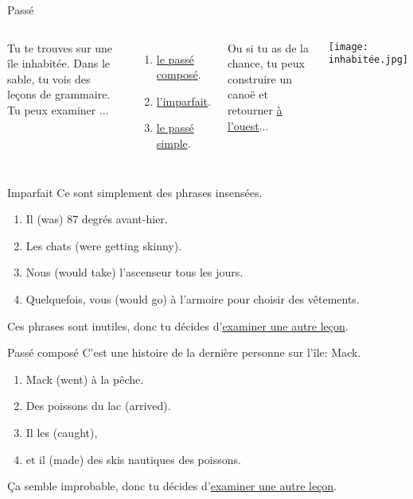 \documentclass{beamer}
\begin{document}
  \begin{frame}{Passé}
    \hypertarget{passé}{}
    \begin{columns}
        Tu te trouves sur une île inhabitée.
        Dans le sable, tu vois des leçons de grammaire.
        Tu peux examiner ...
        \begin{enumerate}
          \item \hyperlink{composé}{le passé composé}.
          \item \hyperlink{imparfait}{l'imparfait}.
          \item \hyperlink{simple}{le passé simple}.
        \end{enumerate}
        Ou si tu as de la chance, tu peux construire un canoë et retourner \hyperlink{mort}{à l'ouest}...
        \begin{center}
          \texttt{[image: inhabitée.jpg]}
        \end{center}
    \end{columns}
  \end{frame}

  \begin{frame}{Imparfait}
    \hypertarget{imparfait}{}
    Ce sont simplement des phrases insensées.
    \begin{enumerate}
      \item Il \underline{} (was) 87 degrés avant-hier.
      \item<3-> Les chats \underline{} (were getting skinny).
      \item<5-> Nous \underline{} (would take) l'ascenseur tous les jours.
      \item<7-> Quelquefois, vous \underline{} (would go) à l'armoire pour choisir des vêtements.
    \end{enumerate}
    Ces phrases sont inutiles, donc tu décides d'\hyperlink{passé}{examiner une autre leçon}.
  \end{frame}

  \begin{frame}{Passé composé}
    \hypertarget{composé}{}
    C'est une histoire de la dernière personne sur l'île: Mack.
    \begin{enumerate}
      \item Mack \underline{} (went) à la pêche.
      \item<3-> Des poissons du lac \underline{} (arrived).
      \item<5-> Il les \underline{} (caught),
      \item<7-> et il \underline{} (made) des skis nautiques des poissons.
    \end{enumerate}
    Ça semble improbable, donc tu décides d'\hyperlink{passé}{examiner une autre leçon}.
  \end{frame}
\end{document}
